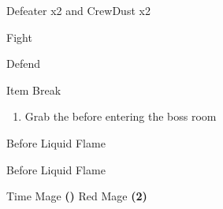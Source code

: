 \begin{paracol}{2}
\switchcolumn
\begin{encounter}{Defeater x2 and CrewDust x2}
    \varwb
    \begin{notes}
        \item {}
        \item {}
    \end{notes}
    \begin{round}{1}
        \bartz Fight \then {}
        \begin{notes}
            \item[] 
        \end{notes}
        \faris Defend
        \begin{notes}
            \item[] 
        \end{notes}
        \lenna Item \then {} \then Break
        \begin{notes}
            \item[] 
        \end{notes}
    \end{round}
    \varwe
\end{encounter}

\vspace{-0.25cm}
\begin{enumerate}[resume]
    \item Grab the  before entering the boss room
\end{enumerate}
\vspace{-0.175cm}

\switchcolumn
\begin{steproute}{Before Liquid Flame}
\end{steproute}

\switchcolumn
\begin{menu}{Before Liquid Flame}
    \varwb
    \begin{jobMenu}
        \lenna Time Mage \textbf{(\pointDown)} \optimize
        \faris Red Mage \textbf{(2\pointLeft)} \optimize
    \end{jobMenu}
    \begin{magicMenu}
        \faris \cure \space \then {}
    \end{magicMenu}
    \varwe
\end{menu}


\end{paracol}
